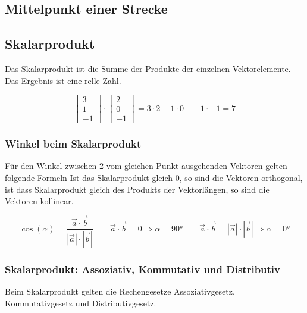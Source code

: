 \subsection{Mittelpunkt einer Strecke}

\subsection{Skalarprodukt}

Das Skalarprodukt ist die Summe der Produkte der einzelnen Vektorelemente.
Das Ergebnis ist eine relle Zahl.

\begin{equation*}
    \begin{bmatrix}
        3 \\
        1 \\
        -1
    \end{bmatrix} \cdot
    \begin{bmatrix}
        2 \\
        0 \\
        -1
    \end{bmatrix} = 3 \cdot 2 + 1 \cdot 0 + -1 \cdot -1 = 7
\end{equation*}

\subsubsection{Winkel beim Skalarprodukt}

Für den Winkel zwischen 2 vom gleichen Punkt ausgehenden Vektoren gelten folgende Formeln
Ist das Skalarprodukt gleich 0, so sind die Vektoren orthogonal, ist dass Skalarprodukt
gleich des Produkts der Vektorlängen, so sind die Vektoren kollinear.

\begin{equation*}
    \cos (\alpha) = \frac{\vec{a} \cdot \vec{b}}{|\vec{a}| \cdot |\vec{b}|}
    \qquad \vec{a} \cdot \vec{b} = 0 \Rightarrow \alpha = 90°
    \qquad \vec{a} \cdot \vec{b} = |\vec{a}| \cdot |\vec{b}| \Rightarrow \alpha = 0°
\end{equation*}

\subsubsection{Skalarprodukt: Assoziativ, Kommutativ und Distributiv}

Beim Skalarprodukt gelten die Rechengesetze Assoziativgesetz, Kommutativgesetz und Distributivgesetz.

